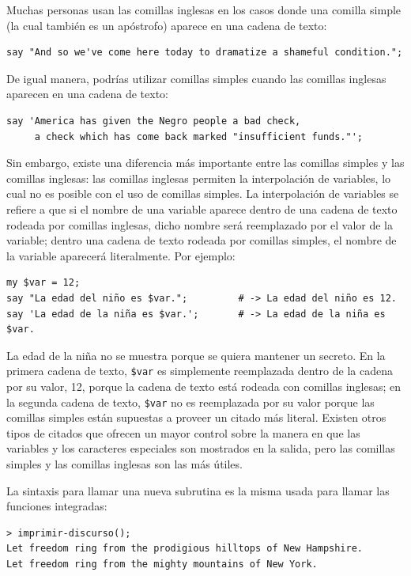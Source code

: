 Muchas personas usan las comillas inglesas en los casos
donde una comilla simple (la cual también es un apóstrofo)
aparece en una cadena de texto:
\begin{lstlisting}
say "And so we've come here today to dramatize a shameful condition.";
\end{lstlisting}
%
De igual manera, podrías utilizar comillas simples 
cuando las comillas inglesas aparecen en una cadena de texto:
\begin{lstlisting}
say 'America has given the Negro people a bad check, 
     a check which has come back marked "insufficient funds."';
\end{lstlisting}
%
Sin embargo, existe una diferencia más importante entre las 
comillas simples y las comillas inglesas: las comillas inglesas
permiten la interpolación de variables, lo cual no es posible
con el uso de comillas simples. La interpolación de variables
se refiere a que si el nombre de una variable aparece dentro
de una cadena de texto rodeada por comillas inglesas, dicho 
nombre será reemplazado por el valor de la variable; dentro una 
cadena de texto rodeada por comillas simples, el nombre de la 
variable aparecerá literalmente.
Por ejemplo:
%
\begin{lstlisting}
my $var = 12;
say "La edad del niño es $var.";         # -> La edad del niño es 12.
say 'La edad de la niña es $var.';       # -> La edad de la niña es $var.
\end{lstlisting}
%
La edad de la niña no se muestra porque se quiera mantener un
secreto. En la primera cadena de texto, \verb|$var| es 
simplemente reemplazada dentro de la cadena por su valor, 12, porque
la cadena de texto está rodeada con comillas inglesas; en la segunda
cadena de texto, \verb|$var| no es reemplazada por su valor porque las 
comillas simples están supuestas a proveer un citado más literal. 
Existen otros tipos de citados que ofrecen un mayor control sobre la
manera en que las variables y los caracteres especiales son mostrados 
en la salida, pero las comillas simples y las comillas inglesas
son las más útiles.

La sintaxis para llamar una nueva subrutina es la misma usada
para llamar las funciones integradas:

\begin{lstlisting}
> imprimir-discurso();
Let freedom ring from the prodigious hilltops of New Hampshire.
Let freedom ring from the mighty mountains of New York.
\end{lstlisting}
%

